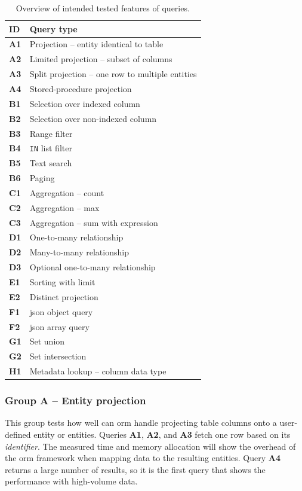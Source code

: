 \begin{table}[th]
\centering
\caption{Overview of intended tested features of queries.}\label{tab:queries-sum}
\begin{tabular}{ll}
\toprule
\textbf{ID} & \textbf{Query type} \\ 
\midrule
\textbf{A1} & Projection -- entity identical to table \\ 
\textbf{A2} & Limited projection -- subset of columns \\ 
\textbf{A3} & Split projection -- one row to multiple entities \\ 
\textbf{A4} & Stored-procedure projection \\ 
\textbf{B1} & Selection over indexed column \\ 
\textbf{B2} & Selection over non-indexed column \\ 
\textbf{B3} & Range filter \\ 
\textbf{B4} & \texttt{IN} list filter \\ 
\textbf{B5} & Text search \\ 
\textbf{B6} & Paging \\ 
\textbf{C1} & Aggregation -- count \\ 
\textbf{C2} & Aggregation -- max \\ 
\textbf{C3} & Aggregation -- sum with expression \\ 
\textbf{D1} & One-to-many relationship\\ 
\textbf{D2} & Many-to-many relationship \\ 
\textbf{D3} & Optional one-to-many relationship \\ 
\textbf{E1} & Sorting with limit \\ 
\textbf{E2} & Distinct projection \\ 
\textbf{F1} & \acrshort{json} object query \\ 
\textbf{F2} & \acrshort{json} array query \\ 
\textbf{G1} & Set union\\ 
\textbf{G2} & Set intersection \\ 
\textbf{H1} & Metadata lookup -- column data type \\ 
\bottomrule
\end{tabular}
\end{table}

\subsubsection{Group A -- Entity projection}
This group tests how well can \acrshort{orm} handle projecting table columns onto a user-defined entity or entities. Queries \textbf{A1}, \textbf{A2}, and \textbf{A3} fetch one row based on its \textit{identifier}. The measured time and memory allocation will show the overhead of the \acrshort{orm} framework when mapping data to the resulting entities. Query \textbf{A4} returns a large number of results, so it is the first query that shows the performance with high-volume data.

